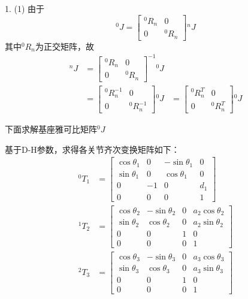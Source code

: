 \documentclass[UTF8, 12pt]{ctexart}
\begin{document}
1.
(1)
由于
\[
{}^0 J = \begin{bmatrix}
            {}^0 R_n & 0 \\
            0 & {}^0 R_n
        \end{bmatrix} {}^n J
\]
其中\({}^0 R_n\)为正交矩阵，故
\[
\begin{aligned}
    {}^n J &= \begin{bmatrix}
            {}^0 R_n & 0 \\
            0 & {}^0 R_n
            \end{bmatrix}^{-1} 
            {}^0 J \\
    &= \begin{bmatrix}
            {}^0 R_n^{-1} & 0 \\
            0 & {}^0 R_n^{-1}
        \end{bmatrix} {}^0 J
    &= \begin{bmatrix}
            {}^0 R_n^T & 0 \\
            0 & {}^0 R_n^T
        \end{bmatrix} {}^0 J
\end{aligned}
\]

下面求解基座雅可比矩阵\({}^0J\)

基于D-H参数，求得各关节齐次变换矩阵如下：
\[
\begin{aligned}
    {}^0 T_1 &= \begin{bmatrix}
                    \cos\theta_1 & 0 & -\sin\theta_1 & 0 \\
                    \sin\theta_1 & 0 & \cos\theta_1 & 0 \\
                    0 & -1 & 0 & d_1 \\
                    0 & 0 & 0 & 1
                \end{bmatrix} \\
    {}^1 T_2 &= \begin{bmatrix}
                    \cos\theta_2 & -\sin\theta_2 & 0 & a_2\cos\theta_2 \\
                    \sin\theta_2 & \cos\theta_2 & 0 & a_2\sin\theta_2 \\
                    0 & 0 & 1 & 0 \\
                    0 & 0 & 0 & 1
                \end{bmatrix} \\
    {}^2 T_3 &= \begin{bmatrix}
                   \cos\theta_3 & -\sin\theta_3 & 0 & a_3\cos\theta_3 \\
                   \sin\theta_3 & \cos\theta_3 & 0 & a_3\sin\theta_3 \\
                   0 & 0 & 1 & 0 \\
                   0 & 0 & 0 & 1
               \end{bmatrix} \\
\end{aligned}
\]
\end{document}
